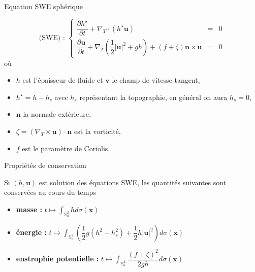 \documentclass[11pt]{beamer}
\def\gint{\displaystyle\int}
\begin{document}

\begin{frame}{Equation SWE sphérique}
\begin{block}{}
\begin{equation}
\text{(SWE) : }\left\lbrace
\begin{array}{rcl}
\dfrac{\partial h^{\star}}{\partial t} + \nabla_T \cdot \left( h^{\star} \mathbf{u} \right) & = & 0 \\
\dfrac{\partial \mathbf{u}}{\partial t} + \nabla_T \left( \dfrac{1}{2}|\mathbf{u}|^2 + gh \right) + \left( f + \zeta \right) \mathbf{n} \times \mathbf{u} & = & 0
\end{array}
\right.
\end{equation}
où  
\begin{itemize}
\item $h$ est l'épaisseur de fluide et $\mathbf{v}$ le champ de vitesse tangent,
\item $h^{\star}=h-h_s$ avec $h_s$ représentant la topographie, en général on aura $h_s=0$,
\item $\mathbf{n}$ la normale extérieure, 
\item $\zeta = \left( \nabla_T \times \mathbf{u} \right) \cdot \mathbf{n}$ est la vorticité,
\item $f$ est le paramètre de Coriolis.
\end{itemize}
\end{block}
\end{frame}


\begin{frame}{Propriétés de conservation}
\begin{block}{}
Si $(h, \mathbf{u})$ est solution des équations SWE, les quantités suivantes sont conservées au cours du temps
\begin{itemize}
\item \textbf{masse :} 
$t \mapsto \gint_{\mathbb{S}^2_a} h d \sigma(\mathbf{x})$
\item \textbf{énergie :}
$t \mapsto \gint_{\mathbb{S}^2_a} \left( \dfrac{1}{2}g(h^2 - h_s^2) + \dfrac{1}{2} h | \mathbf{u} |^2 \right) d \sigma(\mathbf{x})$
\item \textbf{enstrophie potentielle :}
$t \mapsto \gint_{\mathbb{S}^2_a} \dfrac{\left( f + \zeta \right)^2}{2gh} d \sigma(\mathbf{x})$
\end{itemize}
\end{block}
\end{frame}
\end{document}
